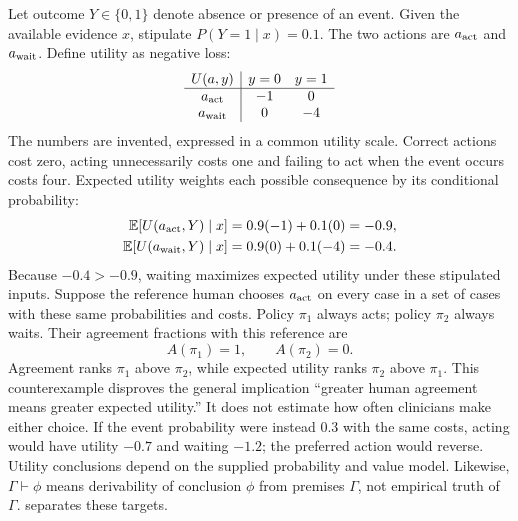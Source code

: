 Let outcome $Y\in\{0,1\}$ denote absence or presence of an event. Given the available evidence $x$, stipulate $P(Y=1\mid x)=0.1$. The two actions are $a_{\rm act}$ and $a_{\rm wait}$. Define utility as negative loss:
\[
\begin{array}{c|cc}
U(a,y)&y=0&y=1\\\hline
a_{\rm act}&-1&0\\
a_{\rm wait}&0&-4
\end{array}
\]
The numbers are invented, expressed in a common utility scale. Correct actions cost zero, acting unnecessarily costs one and failing to act when the event occurs costs four.
Expected utility weights each possible consequence by its conditional probability:
\[
\begin{aligned}
\mathbb E[U(a_{\rm act},Y)\mid x]&=0.9(-1)+0.1(0)=-0.9,\\
\mathbb E[U(a_{\rm wait},Y)\mid x]&=0.9(0)+0.1(-4)=-0.4.
\end{aligned}
\]
Because $-0.4>-0.9$, waiting maximizes expected utility under these stipulated inputs.
Suppose the reference human chooses $a_{\rm act}$ on every case in a set of cases with these same probabilities and costs. Policy $\pi_1$ always acts; policy $\pi_2$ always waits. Their agreement fractions with this reference are
\[
A(\pi_1)=1,\qquad A(\pi_2)=0.
\]
Agreement ranks $\pi_1$ above $\pi_2$, while expected utility ranks $\pi_2$ above $\pi_1$. This counterexample disproves the general implication ``greater human agreement means greater expected utility.'' It does not estimate how often clinicians make either choice.
If the event probability were instead 0.3 with the same costs, acting would have utility $-0.7$ and waiting $-1.2$; the preferred action would reverse. Utility conclusions depend on the supplied probability and value model. Likewise, $\Gamma\vdash\phi$ means derivability of conclusion $\phi$ from premises $\Gamma$, not empirical truth of $\Gamma$.  separates these targets.
